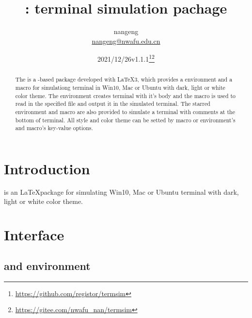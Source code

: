 \documentclass{ctxdoc}
\title{\bfseries\pkg{termsim}: terminal simulation pachage}
\author{nangeng\\ \url{nangeng@nwafu.edu.cn}}
\date{2021/12/26\qquad v1.1.1\thanks{\url{https://github.com/registor/termsim}}\thanks{\url{https://gitee.com/nwafu_nan/termsim}}}
\begin{document}
 \maketitle

 \begin{abstract}

 The  is a -based package developed with \LaTeX3,
 which provides a  environment and a  macro for simulationg
 terminal in Win10, Mac or Ubuntu with dark, light or white color theme.
 The  environment creates terminal with it's body and
 the  macro is used to read in the specified file and output it in the simulated terminal.
 The starred  environment and  macro are also provided
 to simulate a terminal with comments at the bottom of terminal.
 All style and color theme can be setted by  macro
 or environment's and macro's key-value options.

 \end{abstract}

 \tableofcontents

 \section{Introduction}

  is an \LaTeX package for simulating Win10, Mac or Ubuntu
 terminal with dark, light or white color theme.

 \section{Interface}

 \subsection{ and  environment}
\end{document}
